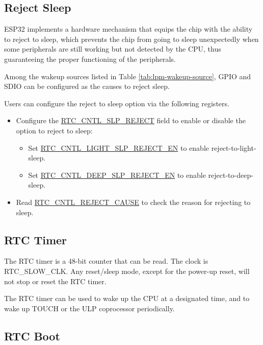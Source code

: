 \documentclass[main\_\_EN.tex]{subfiles}
\begin{document}


\subsection{Reject Sleep}\label{sec:lpm-reject-source}

ESP32 implements a hardware mechanism that equips the chip with the ability to reject to sleep, which prevents the chip from going to sleep unexpectedly when some peripherals are still working but not detected by the CPU, thus guaranteeing the proper functioning of the peripherals.

Among the wakeup sources listed in Table \ref{tab:lpm-wakeup-source}, GPIO and SDIO can be configured as the causes to reject sleep.

Users can configure the reject to sleep option via the following registers.
\begin{itemize}
    \item Configure the \hyperref[regdesc:RTCCNTLSTATE0REG]{RTC\_CNTL\_SLP\_REJECT} field to enable or disable the option to reject to sleep:
        \begin{itemize}
            \item Set \hyperref[regdesc:RTCCNTLSLPREJECTCONFREG]{RTC\_CNTL\_LIGHT\_SLP\_REJECT\_EN} to enable reject-to-light-sleep.
            \item Set \hyperref[regdesc:RTCCNTLSLPREJECTCONFREG]{RTC\_CNTL\_DEEP\_SLP\_REJECT\_EN} to enable reject-to-deep-sleep.
        \end{itemize}
    \item Read \hyperref[regdesc:RTCCNTLSLPREJECTCONFREG]{RTC\_CNTL\_REJECT\_CAUSE} to check the reason for rejecting to sleep.
\end{itemize}

\subsection{RTC Timer}
The RTC timer is a 48-bit counter that can be read. The clock is RTC\_SLOW\_CLK. Any reset/sleep mode, except for the power-up reset, will not stop or reset the RTC timer.

The RTC timer can be used to wake up the CPU at a designated time, and to wake up TOUCH or the ULP coprocessor periodically.

\subsection{RTC Boot}
\end{document}
